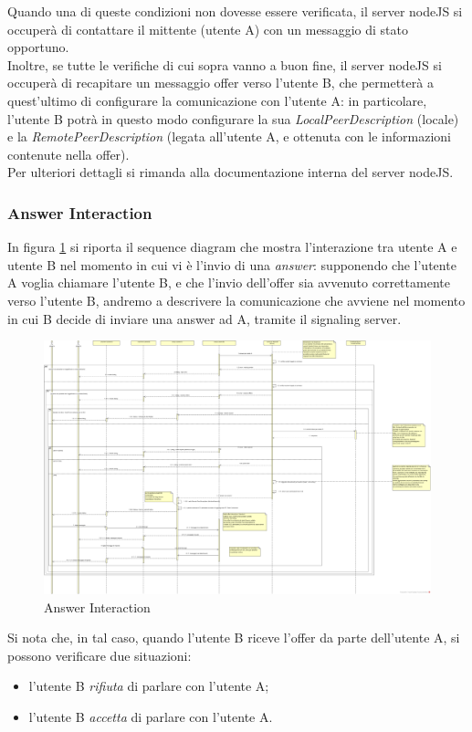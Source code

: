 Quando una di queste condizioni non dovesse essere verificata, il server nodeJS si occuperà di contattare il mittente (utente A) con un messaggio di stato opportuno.\\
Inoltre, se tutte le verifiche di cui sopra vanno a buon fine, il server nodeJS si occuperà di recapitare un messaggio offer verso l'utente B, che permetterà a quest'ultimo di configurare la comunicazione con l'utente A: in particolare, l'utente B potrà in questo modo configurare la sua \textit{LocalPeerDescription} (locale) e la \textit{RemotePeerDescription} (legata all'utente A, e ottenuta con le informazioni contenute nella offer).\\
Per ulteriori dettagli si rimanda alla documentazione interna del server nodeJS.\\


\subsubsection{Answer Interaction}

In figura \ref{gfx:answerinteraction} si riporta il sequence diagram che mostra l'interazione tra utente A e utente B nel momento in cui vi è l'invio di una \textit{answer}: supponendo che l'utente A voglia chiamare l'utente B, e che l'invio dell'offer sia avvenuto correttamente verso l'utente B, andremo a descrivere la comunicazione che avviene nel momento in cui B decide di inviare una answer ad A, tramite il signaling server.

\begin{landscape}
\begin{center}
\begin{figure}[!htbp]
	\centering
	\includegraphics[scale = .26]{img/sequence_answer.png}
	\caption{Answer Interaction}
	\label{gfx:answerinteraction}
\end{figure}
\end{center}	
\end{landscape}%
Si nota che, in tal caso, quando l'utente B riceve l'offer da parte dell'utente A, si possono verificare due situazioni:
\begin{itemize}
\item l'utente B \textit{rifiuta} di parlare con l'utente A;
\item l'utente B \textit{accetta} di parlare con l'utente A.
\end{itemize}

